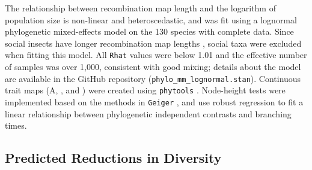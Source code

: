 \documentclass[9pt,lineno]{elife}
\begin{document}
The relationship between recombination map length and the logarithm of
population size is non-linear and heteroscedastic, and was fit using a
lognormal phylogenetic mixed-effects model on the 130 species with complete
data. Since social insects have longer recombination map lengths
\citep{Wilfert2007-dx}, social taxa were excluded when fitting this model.  All
\texttt{Rhat} \citep{Vehtari2019-po} values were below 1.01 and the effective
number of samples was over 1,000, consistent with good mixing; details about
the model are available in the GitHub repository
(\texttt{phylo\_mm\_lognormal.stan}). Continuous trait maps (A,
, and ) were created using
\texttt{phytools} \citep{Revell2012-zq}. Node-height tests were implemented
based on the methods in \texttt{Geiger} \citep{Pennell2014-nx,Harmon2008-tr},
and use robust regression to fit a linear relationship between phylogenetic
independent contrasts and branching times.

\subsection{Predicted Reductions in Diversity}
\label{sec:methods-reduction}
\end{document}
